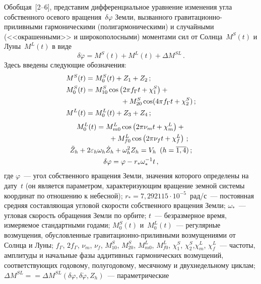 \begin{multicols}{2}
Обобщая~[2--6], представим дифференциальное уравнение изменения угла собственного осевого\linebreak
вращения~$\delta\varphi$ Земли, вызванного гравитацион\-но-приливными гармоническими
(полигармоническими) и случайными (<<окрашенными>> и широкополосными)  моментами сил от Солнца~$M^S(t)$ и 
Луны~$M^L (t)$ в виде
\begin{equation}
\delta \ddot\varphi = M^S (t) +M^L(t) +\Delta M^{SL}\,.
\label{e1sin}
\end{equation}
Здесь введены следующие обозначения:
\begin{align}
M^S(t) &= M_0^S(t) + Z_1+ Z_2\,;\notag\\
M_0^S (t) &=M_{10}^S \cos \left(2\pi f_\Gamma t +\chi_1^S\right)+{}\notag\\
&\quad\quad\quad\quad\quad{}+M_{20}^S \cos (4\pi  f_\Gamma t +\chi_2^S)\,;\label{e2sin}\\
 M^L (t)&= M_0^L(t) + Z_3+Z_4\,;\notag
 \end{align}
 \begin{gather}
 M_0^L(t)=M_{m0}^L \cos \left(2\pi \nu_m t +\chi_m^L\right) +{}\notag\\
\quad\quad\quad\quad\quad {}+ M_{f0}^L \cos \left(2\pi \nu_f t +\chi_f^L\right)\,;\label{e3sin}\\
\ddot Z_h + 2 \varepsilon_h \omega_h \dot Z_h +\omega_h^2 Z_h = V_h \enskip ( h=\overline{1,4})\,;\label{e4sin}\\
\delta\varphi =\varphi - r_* \omega_*^{-1} t\,, \notag
\end{gather}
где $ \varphi$~--- угол собственного вращения Земли,
значения которого определены на дату~$t$ (он является параметром,
характеризующим вращение земной системы координат по отношению к
небесной); $r_* = 7{,}292115 \cdot 10^{-5}$~рад/с~--- постоянная
средняя составляющая угловой скорости собственного вращения Земли;
$\omega_*$~---  угловая скорость обращения  Земли по орбите; $t$~---
безразмерное время, измеряемое стандартными годами; $M_0^S(t)$ и~$M_0^L(t)$~--- регулярные возмущения,
обус\-лов\-лен\-ные гра\-ви\-та\-ци\-он\-но-при\-лив\-ны\-ми возмущениями от Солнца и Луны; $f_\Gamma $, 
$2 f_\Gamma$, $\nu_m$, $\nu_f $, $M_{10}^S$, $M_{20}^S$,
$M_{m0}^L$, $M_{f0}^L$, $\chi_1^S$, $\chi_2^S$,\linebreak $\chi_m^L$,
$\chi_f^L$~--- частоты, амплитуды и начальные фазы аддитивных
гармонических возмущений,
соответствующих годовому, полугодовому, месячному и двухнедельному
циклам; $\Delta M^{SL} =$\linebreak $=\Delta M^{SL} (\delta \varphi, \delta\dot\varphi, Z_h)$~---  параметрические

\end{multicols}
